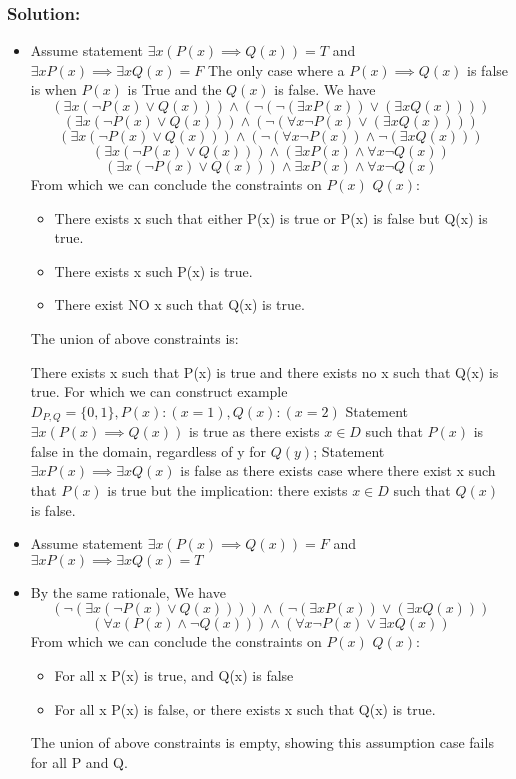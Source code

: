 \documentclass[14pt]{article}
\theoremstyle{definition}
\begin{document}
\subsubsection*{Solution:}
\begin{itemize}
    \item Assume statement $\exists x (P(x) \implies Q(x)) = T$ and $\exists x P(x) \implies \exists x Q(x) = F$ \newline
    The only case where a $P(x) \implies Q(x)$ is false is when $P(x)$ is True and the $Q(x)$ is false. \newline 
    We have
    \[(\exists x (\neg P(x) \lor Q(x))) \land (\neg(\neg(\exists x P(x)) \lor (\exists x Q(x))))\] 
    \[(\exists x (\neg P(x) \lor Q(x))) \land (\neg(\forall x \neg P(x) \lor (\exists x Q(x))))\]
    \[(\exists x (\neg P(x) \lor Q(x))) \land (\neg(\forall x \neg P(x)) \land \neg(\exists x Q(x)))\]
    \[(\exists x (\neg P(x) \lor Q(x))) \land (\exists x P(x) \land \forall x \neg Q(x))\] 
    \[(\exists x (\neg P(x) \lor Q(x))) \land \exists x P(x) \land \forall x \neg Q(x)\] 
    From which we can conclude the constraints on $P(x)$ $Q(x)$: 
    \begin{itemize}
        \item There exists x such that either P(x) is true or P(x) is false but Q(x) is true.
        \item There exists x such P(x) is true. 
        \item There exist NO x such that Q(x) is true.
    \end{itemize}
    The union of above constraints is: 
    
    There exists x such that P(x) is true and there exists no x such that Q(x) is true.
    For which we can construct example $D_{P, Q} = \{0, 1\}, P(x): (x = 1), Q(x): (x = 2)$
    Statement $\exists x (P(x) \implies Q(x)) $ is true as there exists $x \in D$ such that $P(x)$ is false in the domain, regardless of y for $Q(y)$; \newline
    Statement $\exists x P(x) \implies \exists x Q(x)$ is false as there exists case where there exist x such that $P(x)$ is true but the implication: there exists $x \in D$ such that $Q(x)$ is false.
    
    \item Assume statement $\exists x (P(x) \implies Q(x)) = F$ and $\exists x P(x) \implies \exists x Q(x) = T$ \newline
    \item By the same rationale, 
    We have
    \[(\neg(\exists x (\neg P(x) \lor Q(x)))) \land (\neg(\exists x P(x)) \lor (\exists x Q(x)))\] 
    \[(\forall x (P(x) \land \neg Q(x))) \land (\forall x \neg P(x) \lor \exists x Q(x))\]
    From which we can conclude the constraints on $P(x)$ $Q(x)$: 
    \begin{itemize}
        \item For all x P(x) is true, and Q(x) is false
        \item For all x P(x) is false, or there exists x such that Q(x) is true.
    \end{itemize}
    The union of above constraints is empty, showing this assumption case fails for all P and Q.
\end{itemize}
\end{document}
